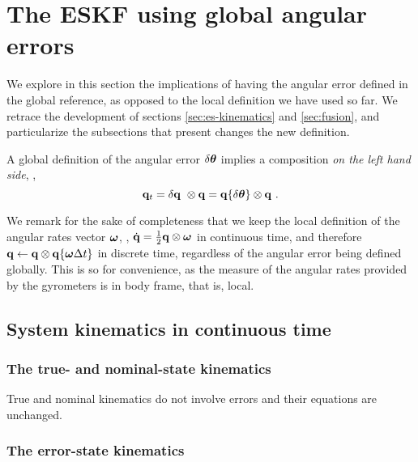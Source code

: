 

\section{The ESKF using global angular errors}
\label{sec:ESKFglobal}

We explore in this section the implications of having the angular error defined in the global reference, as opposed to the local definition we have used so far. 
We retrace the development of sections \ref{sec:es-kinematics} and \ref{sec:fusion}, and particularize the subsections that present changes \wrt the new definition.

A global definition of the angular error $\delta{\bm \theta}$ implies a composition \emph{on the left hand side}, \ie,
%
\begin{equation*}
{\bf q}_t = \delta{\bf q}\ \otimes {\bf q} = {\bf q}\{\delta{\bm \theta}\} \otimes {\bf q}~.
\end{equation*}

We remark for the sake of completeness that we keep the local definition of the angular rates vector ${\bm \omega}$, \ie, $\dot{{\bf q}}=\frac12{\bf q}\otimes{\bm \omega}$ in continuous time, and therefore ${\bf q} \gets {\bf q}\otimes{\bf q}\{{\bm \omega}\Delta t\}$ in discrete time, regardless of the angular error being defined globally. 
This is so for convenience, as the measure of the angular rates provided by the gyrometers is in body frame, that is, local.

\subsection{System kinematics in continuous time}

\subsubsection{The true- and nominal-state kinematics}

True and nominal kinematics do not involve errors and their equations are unchanged.

\subsubsection{The error-state kinematics}

